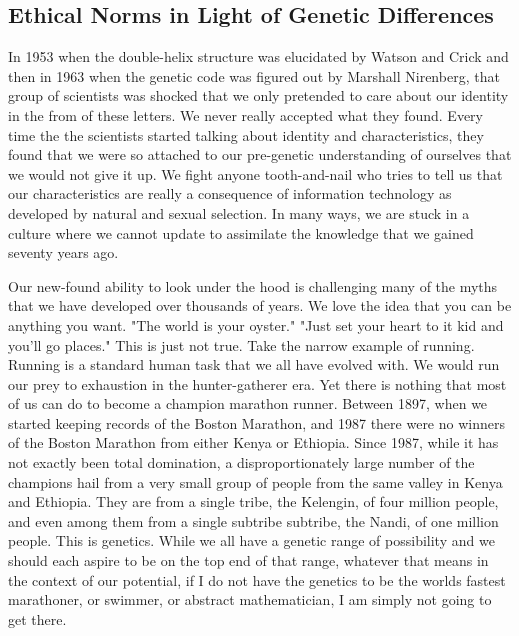 \subsection{Ethical Norms in Light of Genetic Differences}

In 1953 when the double-helix structure was elucidated by Watson and Crick and then in 1963 when the genetic code was figured out by Marshall Nirenberg, that group of scientists was shocked that we only pretended to care about our identity in the from of these letters.
We never really accepted what they found.
Every time the the scientists started talking about identity and characteristics, they found that we were so attached to our pre-genetic understanding of ourselves that we would not give it up.
We fight anyone tooth-and-nail who tries to tell us that our characteristics are really a consequence of information technology as developed by natural and sexual selection.
In many ways, we are stuck in a culture where we cannot update to assimilate the knowledge that we gained seventy years ago.

Our new-found ability to look under the hood is challenging many of the myths that we have developed over thousands of years.
We love the idea that you can be anything you want.
"The world is your oyster."
"Just set your heart to it kid and you'll go places."
This is just not true.
Take the narrow example of running.
Running is a standard human task that we all have evolved with.
We would run our prey to exhaustion in the hunter-gatherer era.
Yet there is nothing that most of us can do to become a champion marathon runner.
Between 1897, when we started keeping records of the Boston Marathon, and 1987 there were no winners of the Boston Marathon from either Kenya or Ethiopia.
Since 1987, while it has not exactly been total domination, a disproportionately large number of the champions hail from a very small group of people from the same valley in Kenya and Ethiopia.
They are from a single tribe, the Kelengin, of four million people, and even among them from a single subtribe subtribe, the Nandi, of one million people.
This is genetics.
While we all have a genetic range of possibility and we should each aspire to be on the top end of that range, whatever that means in the context of our potential, if I do not have the genetics to be the worlds fastest marathoner, or swimmer, or abstract mathematician, I am simply not going to get there.

